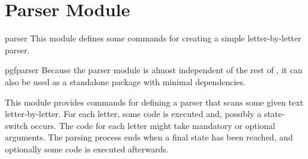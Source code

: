 %
%
%


\section{Parser Module}%
\label{section-module-parser}%

\begin{pgfmodule}{parser}%
    This module defines some commands for creating a simple letter-by-letter
    parser.
\end{pgfmodule}

\begin{package}{pgfparser}
    Because the parser module is almost independent of the rest of \pgfname, it
    can also be used as a standalone package with minimal dependencies.
\end{package}

This module provides commands for defining a parser that scans some given text
letter-by-letter. For each letter, some code is executed and, possibly a
state-switch occurs. The code for each letter might take mandatory or optional
arguments. The parsing process ends when a final state has been reached, and
optionally some code is executed afterwards.

